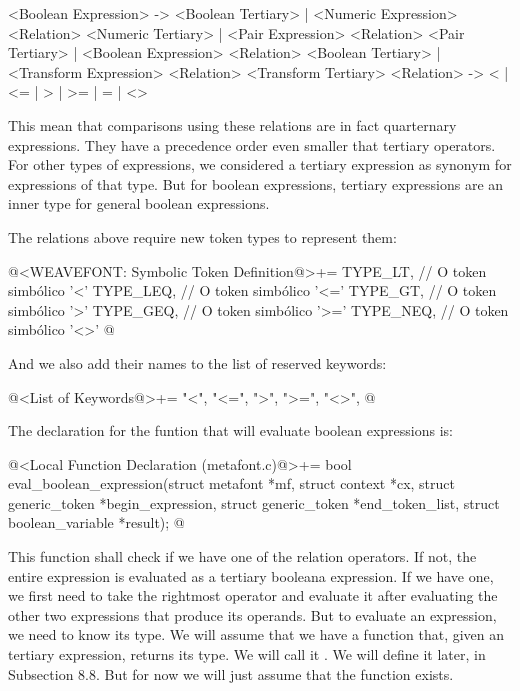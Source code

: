 {{{{{\alinhaverbatim
<Boolean Expression> -> <Boolean Tertiary> |
                        <Numeric Expression> <Relation> <Numeric Tertiary> |
                        <Pair Expression> <Relation> <Pair Tertiary>       |
                        <Boolean Expression> <Relation> <Boolean Tertiary> |
                        <Transform Expression> <Relation> <Transform Tertiary>
<Relation> -> < | <= | > | >= | = | <>
\alinhanormal

This mean that comparisons using these relations are in fact
quarternary expressions. They have a precedence order even smaller
that tertiary operators. For other types of expressions, we considered
a tertiary expression as synonym for expressions of that type. But for
boolean expressions, tertiary expressions are an inner type for
general boolean expressions.

The relations above require new token types to represent them:

\iniciocodigo
@<WEAVEFONT: Symbolic Token Definition@>+=
TYPE_LT,                    // O token simbólico '<'
TYPE_LEQ,                   // O token simbólico '<='
TYPE_GT,                    // O token simbólico '>'
TYPE_GEQ,                   // O token simbólico '>='
TYPE_NEQ,                   // O token simbólico '<>'
@
\fimcodigo

And we also add their names to the list of reserved keywords:

\iniciocodigo
@<List of Keywords@>+=
"<", "<=", ">", ">=", "<>",
@
\fimcodigo

The declaration for the funtion that will evaluate boolean expressions
is:

\iniciocodigo
@<Local Function Declaration (metafont.c)@>+=
bool eval_boolean_expression(struct metafont *mf, struct context *cx,
                             struct generic_token *begin_expression,
                             struct generic_token *end_token_list,
                             struct boolean_variable *result);
@
\fimcodigo

This function shall check if we have one of the relation operators. If
not, the entire expression is evaluated as a tertiary booleana
expression. If we have one, we first need to take the rightmost
operator and evaluate it after evaluating the other two expressions
that produce its operands. But to evaluate an expression, we need to
know its type. We will assume that we have a function that, given an
tertiary expression, returns its type. We will call
it . We will define it
later, in Subsection 8.8. But for now we will just assume that the
function exists.

}}}}}
